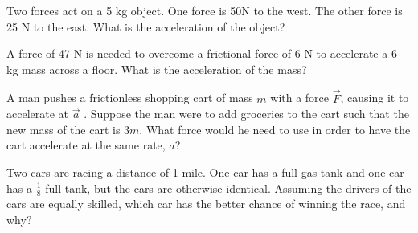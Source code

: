 \documentclass[10pt]{examdesign}
\begin{document}
\begin{multiplechoice} [title={Multiple Choice},
	rearrange=no]


	
	\begin{question}
Two forces act on a 5 kg object.  One force is 50N to the west.  The other force is 25 N to the east.  What is the acceleration of the object?
	\end{question}


\begin{question}
	A force of 47 N is needed to overcome a frictional force of 6 N to accelerate a 6 kg mass across a floor. What is the acceleration of the mass? 
	\choice{4 m/s\textsuperscript{2}}
	\choice{5 m/s\textsuperscript{2}}
	\choice{7 m/s\textsuperscript{2}}
	\choice{41 m/s\textsuperscript{2}}
	\choice{53 m/s\textsuperscript{2}}
\end{question}


\begin{question}
A man pushes a frictionless shopping cart of mass $m$ with a force $\vec{F}$, causing it to accelerate at $\vec{a}$ .  Suppose the man were to add groceries to the cart such that the new mass of the cart is $3m$.  What force would he need to use in order to have the cart accelerate at the same rate, $a$? 


\end{question}

\begin{question}
Two cars are racing a distance of 1 mile. One car has a full gas tank and one car has a $\frac{1}{8}$ full tank, but the cars are otherwise identical. Assuming the drivers of the cars are equally skilled, which car has the better chance of winning the race, and why?
\end{question}


\end{multiplechoice}
\end{document}
